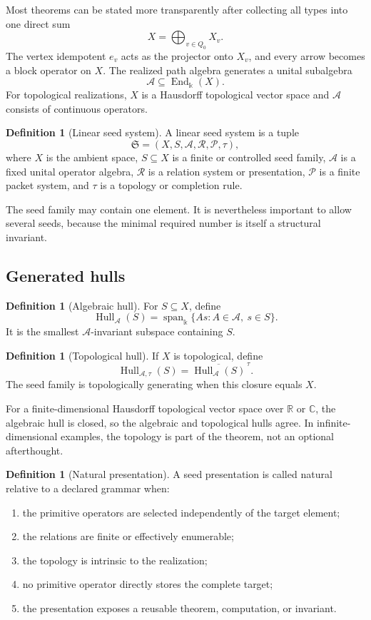 \documentclass[11pt]{article}
\theoremstyle{definition}
\newtheorem{definition}[theorem]{Definition}
\theoremstyle{remark}
\newcommand{\Seed}{\mathfrak S}
\newcommand{\cA}{\mathcal A}
\newcommand{\cR}{\mathcal R}
\newcommand{\cP}{\mathcal P}
\newcommand{\Hull}{\operatorname{Hull}}
\newcommand{\Span}{\operatorname{span}}
\newcommand{\End}{\operatorname{End}}
\newcommand{\bbk}{\mathbb{k}}
\newcommand{\C}{\mathbb C}
\newcommand{\R}{\mathbb R}
\newcommand{\closure}[1]{\overline{#1}}
\begin{document}
Most theorems can be stated more transparently after collecting all types into one direct sum
\[
X=\bigoplus_{v\in Q_0}X_v.
\]
The vertex idempotent $e_v$ acts as the projector onto $X_v$, and every arrow becomes a block operator on $X$. The realized path algebra generates a unital subalgebra
\[
\cA\subseteq\End_{\bbk}(X).
\]
For topological realizations, $X$ is a Hausdorff topological vector space and $\cA$ consists of continuous operators.

\begin{definition}[Linear seed system]
A linear seed system is a tuple
\[
\boxed{
\Seed=(X,S,\cA,\cR,\cP,\tau),
}
\]
where $X$ is the ambient space, $S\subseteq X$ is a finite or controlled seed family, $\cA$ is a fixed unital operator algebra, $\cR$ is a relation system or presentation, $\cP$ is a finite packet system, and $\tau$ is a topology or completion rule.
\end{definition}

The seed family may contain one element. It is nevertheless important to allow several seeds, because the minimal required number is itself a structural invariant.

\subsection{Generated hulls}

\begin{definition}[Algebraic hull]
For $S\subseteq X$, define
\[
\Hull_{\cA}(S)
=
\Span_{\bbk}\{As:A\in\cA,\ s\in S\}.
\]
It is the smallest $\cA$-invariant subspace containing $S$.
\end{definition}

\begin{definition}[Topological hull]
If $X$ is topological, define
\[
\Hull_{\cA,\tau}(S)
=
\closure{\Hull_{\cA}(S)}^{\,\tau}.
\]
The seed family is topologically generating when this closure equals $X$.
\end{definition}

For a finite-dimensional Hausdorff topological vector space over $\R$ or $\C$, the algebraic hull is closed, so the algebraic and topological hulls agree. In infinite-dimensional examples, the topology is part of the theorem, not an optional afterthought.

\begin{definition}[Natural presentation]
A seed presentation is called natural relative to a declared grammar when:
\begin{enumerate}[label=(\alph*)]
\item the primitive operators are selected independently of the target element;
\item the relations are finite or effectively enumerable;
\item the topology is intrinsic to the realization;
\item no primitive operator directly stores the complete target;
\item the presentation exposes a reusable theorem, computation, or invariant.
\end{enumerate}
\end{definition}
\end{document}
